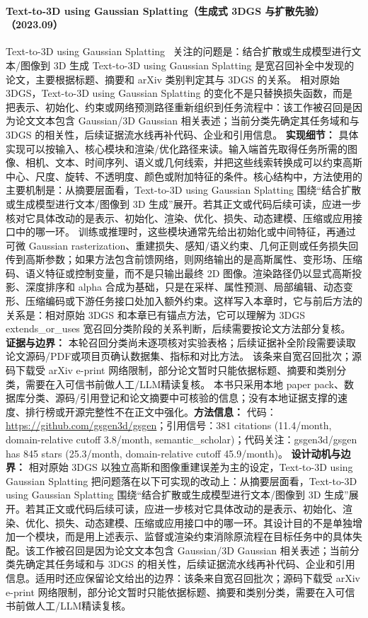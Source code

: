 \paragraph{Text-to-3D using Gaussian Splatting（生成式 3DGS 与扩散先验）（2023.09）}
Text-to-3D using Gaussian Splatting~\cite{2309_16585} 关注的问题是：结合扩散或生成模型进行文本/图像到 3D 生成 Text-to-3D using Gaussian Splatting 是宽召回补全中发现的论文，主要根据标题、摘要和 arXiv 类别判定其与 3DGS 的关系。
相对原始 3DGS，Text-to-3D using Gaussian Splatting 的变化不是只替换损失函数，而是把表示、初始化、约束或网络预测路径重新组织到任务流程中：该工作被召回是因为论文文本包含 Gaussian/3D Gaussian 相关表述；当前分类先确定其任务域和与 3DGS 的相关性，后续证据流水线再补代码、企业和引用信息。
\textbf{实现细节：} 具体实现可以按输入、核心模块和渲染/优化路径来读。输入端首先取得任务所需的图像、相机、文本、时间序列、语义或几何线索，并把这些线索转换成可以约束高斯中心、尺度、旋转、不透明度、颜色或附加特征的条件。核心结构中，方法使用的主要机制是：从摘要层面看，Text-to-3D using Gaussian Splatting 围绕“结合扩散或生成模型进行文本/图像到 3D 生成”展开。若其正文或代码后续可读，应进一步核对它具体改动的是表示、初始化、渲染、优化、损失、动态建模、压缩或应用接口中的哪一环。 训练或推理时，这些模块通常先给出初始化或中间特征，再通过可微 Gaussian rasterization、重建损失、感知/语义约束、几何正则或任务损失回传到高斯参数；如果方法包含前馈网络，则网络输出的是高斯属性、变形场、压缩码、语义特征或控制变量，而不是只输出最终 2D 图像。渲染路径仍以显式高斯投影、深度排序和 alpha 合成为基础，只是在采样、属性预测、局部编辑、动态变形、压缩编码或下游任务接口处加入额外约束。这样写入本章时，它与前后方法的关系是：相对原始 3DGS 和本章已有锚点方法，它可以理解为 3DGS extends\_or\_uses 宽召回分类阶段的关系判断，后续需要按论文方法部分复核。
\textbf{证据与边界：} 本轮召回分类尚未逐项核对实验表格；后续证据补全阶段需要读取论文源码/PDF或项目页确认数据集、指标和对比方法。 该条来自宽召回批次；源码下载受 arXiv e-print 网络限制，部分论文暂时只能依据标题、摘要和类别分类，需要在入可信书前做人工/LLM精读复核。 本书只采用本地 paper pack、数据库分类、源码/引用登记和论文摘要中可核验的信息；没有本地证据支撑的速度、排行榜或开源完整性不在正文中强化。\textbf{方法信息：} 代码：\url{https://github.com/gsgen3d/gsgen}；引用信号：381 citations (11.4/month, domain-relative cutoff 3.8/month, semantic\_scholar)；代码关注：gsgen3d/gsgen has 845 stars (25.3/month, domain-relative cutoff 45.9/month)。
\textbf{设计动机与边界：} 相对原始 3DGS 以独立高斯和图像重建误差为主的设定，Text-to-3D using Gaussian Splatting 把问题落在以下可实现的改动上：从摘要层面看，Text-to-3D using Gaussian Splatting 围绕“结合扩散或生成模型进行文本/图像到 3D 生成”展开。若其正文或代码后续可读，应进一步核对它具体改动的是表示、初始化、渲染、优化、损失、动态建模、压缩或应用接口中的哪一环。其设计目的不是单独增加一个模块，而是用上述表示、监督或渲染约束消除原流程在目标任务中的具体失配。该工作被召回是因为论文文本包含 Gaussian/3D Gaussian 相关表述；当前分类先确定其任务域和与 3DGS 的相关性，后续证据流水线再补代码、企业和引用信息。适用时还应保留论文给出的边界：该条来自宽召回批次；源码下载受 arXiv e-print 网络限制，部分论文暂时只能依据标题、摘要和类别分类，需要在入可信书前做人工/LLM精读复核。

